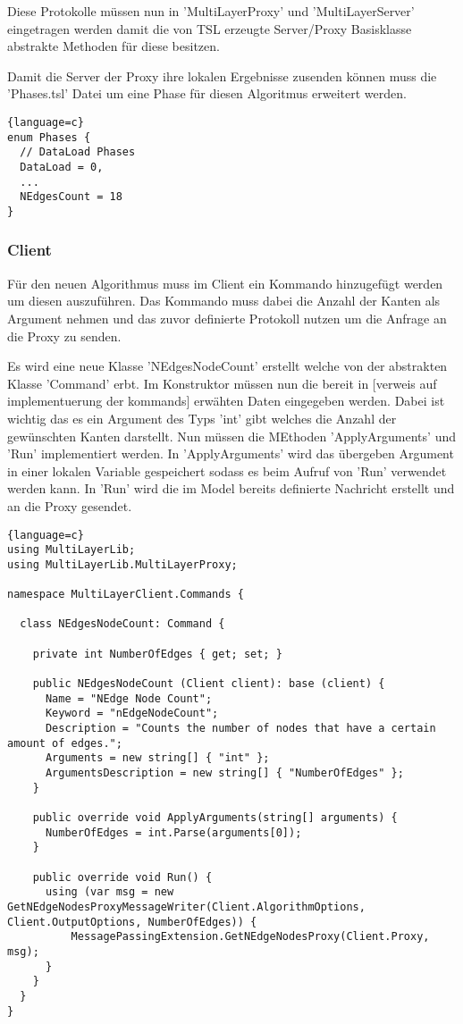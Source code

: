 Diese Protokolle müssen nun in 'MultiLayerProxy' und 'MultiLayerServer' eingetragen werden damit die von TSL erzeugte Server/Proxy Basisklasse abstrakte Methoden für diese besitzen.

Damit die Server der Proxy ihre lokalen Ergebnisse zusenden können muss die 'Phases.tsl' Datei um eine Phase für diesen Algoritmus erweitert werden.

\begin{lstlisting}{language=c}
enum Phases {
  // DataLoad Phases
  DataLoad = 0,
  ...
  NEdgesCount = 18
}
\end{lstlisting}


\subsubsection{Client}

Für den neuen Algorithmus muss im Client ein Kommando hinzugefügt werden um diesen auszuführen. Das Kommando muss dabei die Anzahl der Kanten als Argument nehmen und das zuvor definierte Protokoll nutzen um die Anfrage an die Proxy zu senden.

Es wird eine neue Klasse 'NEdgesNodeCount' erstellt welche von der abstrakten Klasse 'Command' erbt. Im Konstruktor müssen nun die bereit in [verweis auf implementuerung der kommands] erwähten Daten eingegeben werden. Dabei ist wichtig das es ein Argument des Typs 'int' gibt welches die Anzahl der gewünschten Kanten darstellt.
Nun müssen die MEthoden 'ApplyArguments' und 'Run' implementiert werden.
In 'ApplyArguments' wird das übergeben Argument in einer lokalen Variable gespeichert sodass es beim Aufruf von 'Run' verwendet werden kann.
In 'Run' wird die im Model bereits definierte Nachricht erstellt und an die Proxy gesendet.

\begin{lstlisting}{language=c}
using MultiLayerLib;
using MultiLayerLib.MultiLayerProxy;

namespace MultiLayerClient.Commands {

  class NEdgesNodeCount: Command {

    private int NumberOfEdges { get; set; }

    public NEdgesNodeCount (Client client): base (client) {
      Name = "NEdge Node Count";
      Keyword = "nEdgeNodeCount";
      Description = "Counts the number of nodes that have a certain amount of edges.";
      Arguments = new string[] { "int" };
      ArgumentsDescription = new string[] { "NumberOfEdges" };
    }

    public override void ApplyArguments(string[] arguments) {
      NumberOfEdges = int.Parse(arguments[0]);
    }

    public override void Run() {
      using (var msg = new GetNEdgeNodesProxyMessageWriter(Client.AlgorithmOptions, Client.OutputOptions, NumberOfEdges)) {
          MessagePassingExtension.GetNEdgeNodesProxy(Client.Proxy, msg);
      }      
    }
  }
}
\end{lstlisting}



